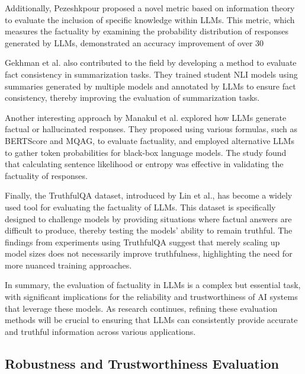Additionally, Pezeshkpour proposed a novel metric based on information theory to evaluate the inclusion of specific knowledge within LLMs. This metric, which measures the factuality by examining the probability distribution of responses generated by LLMs, demonstrated an accuracy improvement of over 30%

Gekhman et al. also contributed to the field by developing a method to evaluate fact consistency in summarization tasks. They trained student NLI models using summaries generated by multiple models and annotated by LLMs to ensure fact consistency, thereby improving the evaluation of summarization tasks.

Another interesting approach by Manakul et al. explored how LLMs generate factual or hallucinated responses. They proposed using various formulas, such as BERTScore and MQAG, to evaluate factuality, and employed alternative LLMs to gather token probabilities for black-box language models. The study found that calculating sentence likelihood or entropy was effective in validating the factuality of responses.

Finally, the TruthfulQA dataset, introduced by Lin et al., has become a widely used tool for evaluating the factuality of LLMs. This dataset is specifically designed to challenge models by providing situations where factual answers are difficult to produce, thereby testing the models' ability to remain truthful. The findings from experiments using TruthfulQA suggest that merely scaling up model sizes does not necessarily improve truthfulness, highlighting the need for more nuanced training approaches.

In summary, the evaluation of factuality in LLMs is a complex but essential task, with significant implications for the reliability and trustworthiness of AI systems that leverage these models. As research continues, refining these evaluation methods will be crucial to ensuring that LLMs can consistently provide accurate and truthful information across various applications.

\subsection{Robustness and Trustworthiness Evaluation}

